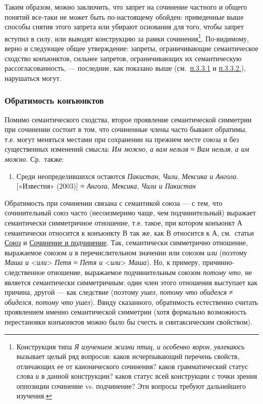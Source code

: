 Таким образом, можно заключить, что запрет на сочинение частного и
общего понятий все-таки не может быть по-настоящему обойден: приведенные
выше способы снятия этого запрета или убирают основания для того, чтобы
запрет вступил в силу, или выводят конструкцию за рамки
сочинения\footnote{Конструкция типа \textit{Я изучением жизни птиц},
  \textit{и особенно ворон}, \textit{увлекаюсь} вызывает целый ряд вопросов:
  каков исчерпывающий перечень свойств, отличающих ее от канонического
  сочинения? каков грамматический статус слова \textit{и} в данной
  конструкции? каков статус всей конструкции с точки зрения оппозиции
  сочинение vs. подчинение? Эти вопросы требуют дальнейшего изучения.}.
По-видимому, верно и следующее общее утверждение: запреты,
ограничивающие семантическое сходство конъюнктов, сильнее запретов,
ограничивающих их семантическую рассогласованность, --- последние, как
показано выше (см.~\underline{п.3.3.1} и \underline{п.3.3.2.}),
нарушаться могут.

\subsubsection{Обратимость
конъюнктов}\label{ux43eux431ux440ux430ux442ux438ux43cux43eux441ux442ux44c-ux43aux43eux43dux44aux44eux43dux43aux442ux43eux432}

Помимо семантического сходства, второе проявление семантической
симметрии при сочинении состоит в том, что сочиненные члены часто бывают
обратимы, т.е. могут меняться местами при сохранении на прежнем месте
союза и без существенных изменений смысла: \textit{Им можно}, \textit{а вам
нельзя} ≈ \textit{Вам нельзя}, \textit{а им можно}. Ср.~также:

\begin{enumerate}
\def\labelenumi{(\arabic{enumi})}
\setcounter{enumi}{23}
\item
  Среди неопределившихся остаются \textit{Пакистан}, \textit{Чили},
  \textit{Мексика и Ангола}. {[}«Известия» (2003){]} ≈ \textit{Ангола},
  \textit{Мексика}, \textit{Чили и Пакистан}
\end{enumerate}

Обратимость при сочинении связана с семантикой союза --- с тем, что
сочинительный союз часто (несоизмеримо чаще, чем подчинительный)
выражает семантически симметричное отношение, т.е. такое, при котором
конъюнкт А семантически относится к конъюнкту В так же, как В относится
к А, см.~статьи \underline{Союз} и \underline{Сочинение и подчинение}.
Так, семантически симметрично отношение, выражаемое союзом \textit{и} в
перечислительном значении или союзом \textit{или} (поэтому \textit{Маша и}
\textless{}\textit{или}\textgreater{} \textit{Петя} ≈ \textit{Петя и}
\textless{}\textit{или}\textgreater{} \textit{Маша}). Но, к примеру,
причинно-следственное отношение, выражаемое подчинительным союзом
\textit{потому что}, не является семантически симметричным: один член
этого отношения выступает как причина, другой --- как следствие (поэтому
\textit{ушел}, \textit{потому что обиделся} ≠ \textit{обиделся}, \textit{потому
что ушел}). Ввиду сказанного, обратимость естественно считать
проявлением именно семантической симметрии (хотя формально возможность
перестановки конъюнктов можно было бы счесть и синтаксическим
свойством).


